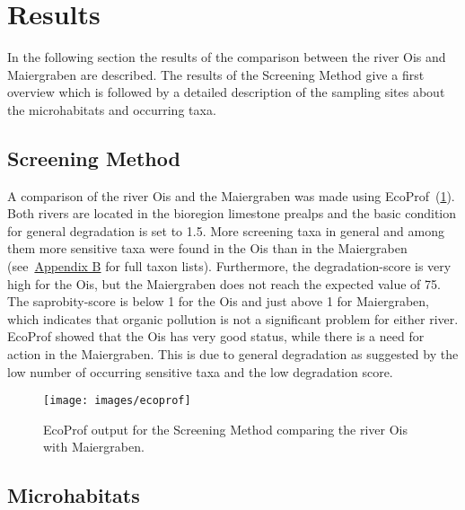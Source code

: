 
\section{Results}\label{sec:results}                           %

In the following section the results of the comparison between the river Ois and Maiergraben are described. The results of the Screening Method give a first overview which is followed by a detailed description of the sampling sites about the microhabitats and occurring taxa.

\subsection{Screening Method}\label{sec:screening_method}       %

A comparison of the river Ois and the Maiergraben was made using EcoProf~(\cref{fig:ecoprof}). Both rivers are located in the bioregion limestone prealps and the basic condition for general degradation is set to 1.5. More screening taxa in general and among them more sensitive taxa were found in the Ois than in the Maiergraben (see~\hyperref[appendixB]{Appendix B} for full taxon lists). Furthermore, the degradation-score is very high for the Ois, but the Maiergraben does not reach the expected value of 75. The saprobity-score is below 1 for the Ois and just above 1 for Maiergraben, which indicates that organic pollution is not a significant problem for either river. EcoProf showed that the Ois has very good status, while there is a need for action in the Maiergraben. This is due to general degradation as suggested by the low number of occurring sensitive taxa and the low degradation score.

\begin{figure}[!htb]                              %
  \center
  \texttt{[image: images/ecoprof]}                %
  \caption{EcoProf output for the Screening Method comparing the river Ois with Maiergraben.}        %
  \label{fig:ecoprof}                                                       %
\end{figure}




\subsection{Microhabitats}\label{sec:microhabitats_results}       %

